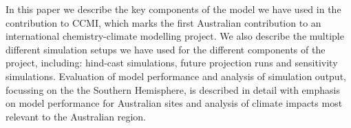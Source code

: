 In this paper we describe the key components of the model we have used in the contribution to CCMI, which marks the first Australian contribution to an international chemistry-climate modelling project. We also describe the multiple different simulation setups we have used for the different components of the project, including: hind-cast simulations, future projection runs and sensitivity simulations. Evaluation of model performance and analysis of simulation output, focussing on the the Southern Hemisphere, is described in detail with emphasis on model performance for Australian sites and analysis of climate impacts most relevant to the Australian region.